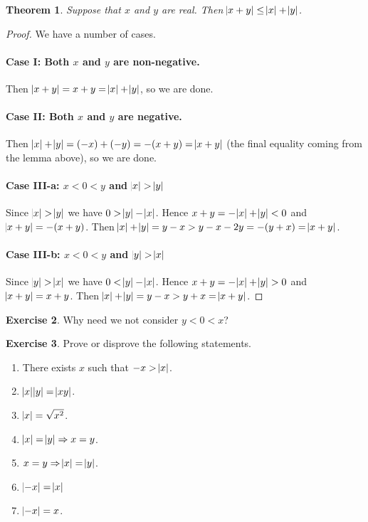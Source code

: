 \documentclass[a4paper]{amsart}
\newtheorem{thm}{Theorem}[section]
\theoremstyle{definition}
\newtheorem{exercise}[thm]{Exercise}
\theoremstyle{remark}
\begin{document}
\begin{thm}
  Suppose that $ x $ and $ y $ are real. Then $ \abs{x + y} \leq \abs{x} + \abs{y} $.
\end{thm}
\begin{proof}
  We have a number of cases.

  \paragraph{Case I: Both $ x $ and $ y $ are non-negative.}
  Then $ \abs{x + y} = x + y = \abs{x} + \abs{y} $, so we are done.

  \paragraph{Case II: Both $ x $ and $ y $ are negative.}
  Then $ \abs{x} + \abs{y} = (-x) + (-y) = -(x + y) = \abs{x + y} $ (the final equality coming from the lemma above), so we are done.

  \paragraph{Case III-a: $ x < 0 < y $ and $ \abs{x} > \abs{y} $}
  Since $ \abs{x} > \abs{y} $ we have $ 0 > \abs{y} - \abs{x} $. Hence $ x + y = -\abs{x} + \abs{y} < 0 $ and $ \abs{x + y} = -(x + y) $.
  Then $ \abs{x} + \abs{y} = y - x > y - x - 2y = -(y + x) = \abs{x + y} $.

  \paragraph{Case III-b: $ x < 0 < y $ and $ \abs{y} > \abs{x} $}
  Since $ \abs{y} > \abs{x} $ we have $ 0 < \abs{y} - \abs{x} $. Hence $ x + y = -\abs{x} + \abs{y} > 0 $ and $ \abs{x + y} = x + y $.
  Then $ \abs{x} + \abs{y} = y - x > y + x = \abs{x + y} $.
\end{proof}

\begin{exercise}
  Why need we not consider $ y < 0 < x $?
\end{exercise}

\begin{exercise}
  Prove or disprove the following statements.
  \begin{enumerate}
    \item There exists $ x $ such that $ -x > \abs{x} $.
    \item $ \abs{x}\abs{y} = \abs{xy} $.
    \item $ \abs{x} = \sqrt{x^2} $.
    \item $ \abs{x} = \abs{y} \Rightarrow x = y $.
    \item $ x = y \Rightarrow \abs{x} = \abs{y} $.
    \item $ \abs{-x} = \abs{x} $
    \item $ \abs{-x} = x $.
  \end{enumerate}
\end{exercise}
\end{document}
